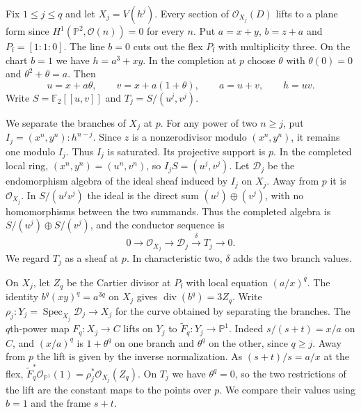 \documentclass[11pt,a4paper,reqno]{amsart}
\numberwithin{equation}{section}
\theoremstyle{plain}
\newcommand{\OO}{\mathcal O}
\newcommand{\PP}{\mathbb P}
\newcommand{\Dcal}{\mathcal D}
\DeclareMathOperator{\Spec}{Spec}
\begin{document}
Fix $1\le j\le q$ and let $X_j=V(h^j)$. Every section of $\OO_{X_j}(D)$ lifts to a plane form since $H^1(\PP^2,\OO(n))=0$ for every $n$. Put $a=x+y$, $b=z+a$ and $P_{\mathrm f}=[1:1:0]$. The line $b=0$ cuts out the flex $P_{\mathrm f}$ with multiplicity three. On the chart $b=1$ we have $h=a^3+xy$. In the completion at $p$ choose $\theta$ with $\theta(0)=0$ and $\theta^2+\theta=a$. Then
\[
 u=x+a\theta,\qquad v=x+a(1+\theta),\qquad a=u+v,\qquad h=uv .
\]
Write $S=\mathbb F_2[[u,v]]$ and $T_j=S/(u^j,v^j)$.

We separate the branches of $X_j$ at $p$. For any power of two $n\ge j$, put $I_j=(x^n,y^n):h^{n-j}$. Since $z$ is a nonzerodivisor modulo $(x^n,y^n)$, it remains one modulo $I_j$. Thus $I_j$ is saturated. Its projective support is $p$. In the completed local ring, $(x^n,y^n)=(u^n,v^n)$, so $I_jS=(u^j,v^j)$. Let $\Dcal_j$ be the endomorphism algebra of the ideal sheaf induced by $I_j$ on $X_j$. Away from $p$ it is $\OO_{X_j}$. In $S/(u^jv^j)$ the ideal is the direct sum $(u^j)\oplus(v^j)$, with no homomorphisms between the two summands. Thus the completed algebra is $S/(u^j)\oplus S/(v^j)$, and the conductor sequence is
\begin{equation}\label{conductor}
 0\longrightarrow\OO_{X_j}\longrightarrow\Dcal_j
   \xrightarrow{\delta}T_j\longrightarrow0 .
\end{equation}
We regard $T_j$ as a sheaf at $p$. In characteristic two, $\delta$ adds the two branch values.

On $X_j$, let $Z_q$ be the Cartier divisor at $P_{\mathrm f}$ with local equation $(a/x)^q$. The identity $b^q(xy)^q=a^{3q}$ on $X_j$ gives $\operatorname{div}(b^q)=3Z_q$. Write $\rho_j:Y_j=\Spec_{X_j}\Dcal_j\to X_j$ for the curve obtained by separating the branches. The $q$th-power map $F_q:X_j\to C$ lifts on $Y_j$ to $\widetilde F_q:Y_j\to\PP^1$. Indeed $s/(s+t)=x/a$ on $C$, and $(x/a)^q$ is $1+\theta^q$ on one branch and $\theta^q$ on the other, since $q\ge j$. Away from $p$ the lift is given by the inverse normalization. As $(s+t)/s=a/x$ at the flex, $\widetilde F_q^*\OO_{\PP^1}(1)=\rho_j^*\OO_{X_j}(Z_q)$. On $T_j$ we have $\theta^q=0$, so the two restrictions of the lift are the constant maps to the points over $p$. We compare their values using $b=1$ and the frame $s+t$.
\end{document}
